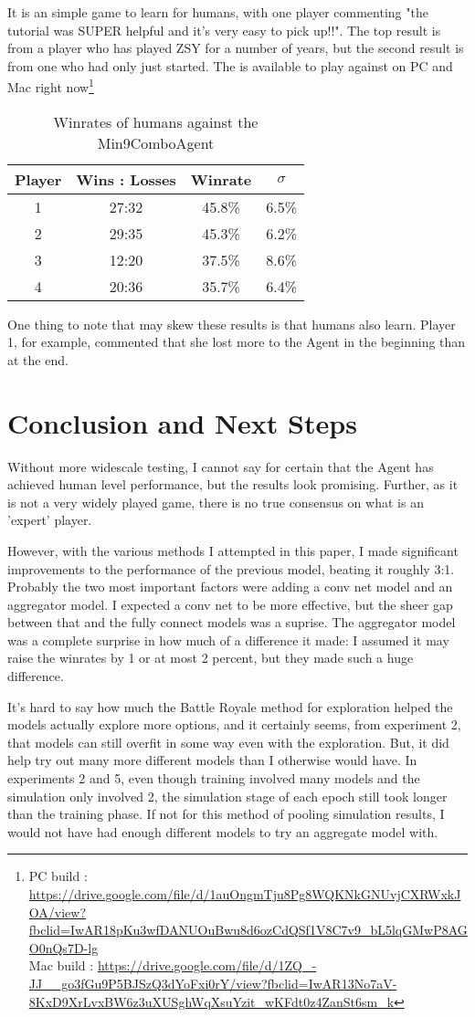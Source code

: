 \documentclass{article}
\newcommand{\beginTable}[2]{
\begin{table}[t]
\caption{#1}
\vskip 0.15in
\begin{center}
\begin{small}
\begin{sc}
\begin{tabular}{#2}
\toprule
}
\newcommand{\finTable}{
\bottomrule
\end{tabular}
\end{sc}
\end{small}
\end{center}
\vskip -0.1in
\end{table}
}
\begin{document}
It is an simple game to learn for humans, with one player commenting "the tutorial was SUPER helpful and it’s very easy to pick up!!". The top result is from a player who has played ZSY for a number of years, but the second result is from one who had only just started. The is available to play against on PC and Mac right now\footnote{PC build : \url{https://drive.google.com/file/d/1auOngmTju8Pg8WQKNkGNUvjCXRWxkJOA/view?fbclid=IwAR18pKu3wfDANUOuBwu8d6ozCdQSf1V8C7v9_bL5lqGMwP8AGO0nQs7D-lg}\\
Mac build : \url{https://drive.google.com/file/d/1ZQ_-JJ__go3fGu9P5BJSzQ3dYoFxi0rY/view?fbclid=IwAR13No7aV-8KxD9XrLvxBW6z3uXUSghWqXsuYzit_wKFdt0z4ZanSt6sm_k}}

\beginTable{Winrates of humans against the Min9ComboAgent}{cccc}
Player & Wins : Losses & Winrate & $\sigma$  \\
\midrule
1 & 27:32 & 45.8\% & 6.5\% \\
2 & 29:35 & 45.3\% & 6.2\% \\
3 & 12:20 & 37.5\% & 8.6\% \\
4 & 20:36 & 35.7\% & 6.4\% \\
\finTable

One thing to note that may skew these results is that humans also learn. Player 1, for example, commented that she lost more to the Agent in the beginning than at the end.

\section{Conclusion and Next Steps}
Without more widescale testing, I cannot say for certain that the Agent has achieved human level performance, but the results look promising. Further, as it is not a very widely played game, there is no true consensus on what is an 'expert' player.

However, with the various methods I attempted in this paper, I made significant improvements to the performance of the previous model, beating it roughly 3:1. Probably the two most important factors were adding a conv net model and an aggregator model. I expected a conv net to be more effective, but the sheer gap between that and the fully connect models was a suprise. The aggregator model was a complete surprise in how much of a difference it made: I assumed it may raise the winrates by 1 or at most 2 percent, but they made such a huge difference.

It's hard to say how much the Battle Royale method for exploration helped the models actually explore more options, and it certainly seems, from experiment 2, that models can still overfit in some way even with the exploration. But, it did help try out many more different models than I otherwise would have. In experiments 2 and 5, even though training involved many models and the simulation only involved 2, the simulation stage of each epoch still took longer than the training phase. If not for this method of pooling simulation results, I would not have had enough different models to try an aggregate model with. 
\end{document}
